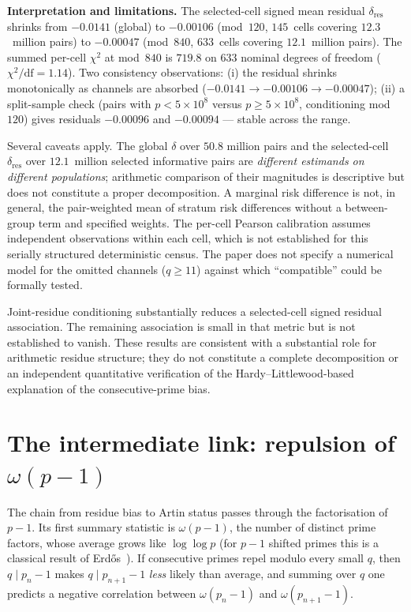 \documentclass[11pt]{amsart}
\theoremstyle{definition}
\begin{document}
\textbf{Interpretation and limitations.}
The selected-cell signed mean residual $\delta_{\mathrm{res}}$ shrinks from
$-0.0141$ (global) to $-0.00106$ (mod~$120$, $145$~cells covering
$12.3$~million pairs) to $-0.00047$ (mod~$840$, $633$~cells covering
$12.1$~million pairs). The summed per-cell $\chi^2$ at mod~$840$ is
$719.8$ on $633$ nominal degrees of freedom ($\chi^2/\mathrm{df} = 1.14$).
Two consistency observations: (i) the residual shrinks monotonically as
channels are absorbed ($-0.0141 \to -0.00106 \to -0.00047$); (ii) a
split-sample check (pairs with $p < 5 \times 10^8$ versus
$p \ge 5 \times 10^8$, conditioning mod $120$) gives residuals
$-0.00096$ and $-0.00094$ --- stable across the range.

Several caveats apply. The global $\delta$ over $50.8$ million pairs and the
selected-cell $\delta_{\mathrm{res}}$ over $12.1$~million selected informative
pairs are \emph{different estimands on different populations}; arithmetic
comparison of their magnitudes is descriptive but does not constitute a proper
decomposition. A marginal risk difference is not, in general, the pair-weighted
mean of stratum risk differences without a between-group term and specified
weights. The per-cell Pearson calibration assumes independent observations
within each cell, which is not established for this serially structured
deterministic census. The paper does not specify a numerical model for the
omitted channels ($q \ge 11$) against which ``compatible'' could be formally
tested.

Joint-residue conditioning substantially reduces a selected-cell signed
residual association. The remaining association is small in that metric but is
not established to vanish. These results are consistent with a substantial role
for arithmetic residue structure; they do not constitute a complete
decomposition or an independent quantitative verification of the
Hardy--Littlewood-based explanation of the consecutive-prime bias.

\section{The intermediate link: repulsion of \texorpdfstring{$\omega(p-1)$}{omega(p-1)}}
\label{sec:omega}

The chain from residue bias to Artin status passes through the factorisation
of $p - 1$. Its first summary statistic is
$\omega(p-1)$, the number of distinct prime factors, whose average grows like
$\log\log p$ (for $p - 1$ shifted primes this is a classical result of
Erd\H{o}s~\cite{Erdos1935}). If consecutive primes repel modulo every small
$q$, then $q \mid p_n - 1$ makes $q \mid p_{n+1} - 1$ \emph{less} likely than
average, and summing over $q$ one predicts a negative correlation between
$\omega(p_n - 1)$ and $\omega(p_{n+1} - 1)$.
\end{document}
